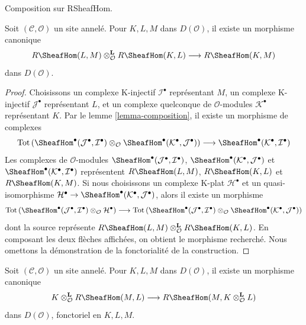 \begin{lemma}
\label{lemma-internal-hom-composition}
\begin{slogan}
Composition sur RSheafHom.
\end{slogan}
Soit $(\mathcal{C}, \mathcal{O})$ un site annelé. Pour $K, L, M$ dans
$D(\mathcal{O})$, il existe un morphisme canonique
$$
R\SheafHom(L, M) \otimes_\mathcal{O}^\mathbf{L} R\SheafHom(K, L)
\longrightarrow R\SheafHom(K, M)
$$
dans $D(\mathcal{O})$.
\end{lemma}

\begin{proof}
Choisissons un complexe K-injectif $\mathcal{I}^\bullet$ représentant $M$,
un complexe K-injectif $\mathcal{J}^\bullet$ représentant $L$, et un complexe
quelconque de $\mathcal{O}$-modules $\mathcal{K}^\bullet$ représentant $K$.
Par le lemme \ref{lemma-composition}, il existe un morphisme de complexes
$$
\text{Tot}\left(
\SheafHom^\bullet(\mathcal{J}^\bullet, \mathcal{I}^\bullet)
\otimes_\mathcal{O}
\SheafHom^\bullet(\mathcal{K}^\bullet, \mathcal{J}^\bullet)
\right)
\longrightarrow
\SheafHom^\bullet(\mathcal{K}^\bullet, \mathcal{I}^\bullet)
$$
Les complexes de $\mathcal{O}$-modules
$\SheafHom^\bullet(\mathcal{J}^\bullet, \mathcal{I}^\bullet)$,
$\SheafHom^\bullet(\mathcal{K}^\bullet, \mathcal{J}^\bullet)$ et
$\SheafHom^\bullet(\mathcal{K}^\bullet, \mathcal{I}^\bullet)$
représentent $R\SheafHom(L, M)$, $R\SheafHom(K, L)$ et $R\SheafHom(K, M)$.
Si nous choisissons un complexe K-plat $\mathcal{H}^\bullet$ et un
quasi-isomorphisme
$\mathcal{H}^\bullet \to
\SheafHom^\bullet(\mathcal{K}^\bullet, \mathcal{J}^\bullet)$,
alors il existe un morphisme
$$
\text{Tot}\left(
\SheafHom^\bullet(\mathcal{J}^\bullet, \mathcal{I}^\bullet)
\otimes_\mathcal{O} \mathcal{H}^\bullet
\right)
\longrightarrow
\text{Tot}\left(
\SheafHom^\bullet(\mathcal{J}^\bullet, \mathcal{I}^\bullet)
\otimes_\mathcal{O}
\SheafHom^\bullet(\mathcal{K}^\bullet, \mathcal{J}^\bullet)
\right)
$$
dont la source représente
$R\SheafHom(L, M) \otimes_\mathcal{O}^\mathbf{L} R\SheafHom(K, L)$.
En composant les deux flèches affichées, on obtient le morphisme recherché.
Nous omettons la démonstration de la fonctorialité de la construction.
\end{proof}

\begin{lemma}
\label{lemma-internal-hom-diagonal-better}
Soit $(\mathcal{C}, \mathcal{O})$ un site annelé. Pour $K, L, M$ dans
$D(\mathcal{O})$, il existe un morphisme canonique
$$
K \otimes_\mathcal{O}^\mathbf{L} R\SheafHom(M, L)
\longrightarrow
R\SheafHom(M, K \otimes_\mathcal{O}^\mathbf{L} L)
$$
dans $D(\mathcal{O})$, fonctoriel en $K, L, M$.
\end{lemma}

